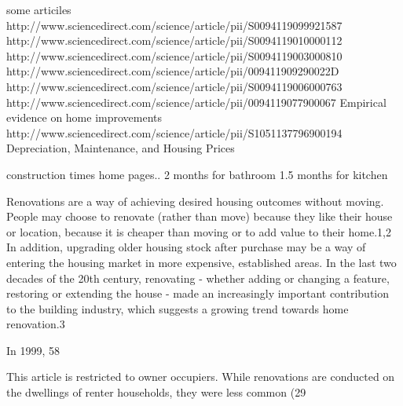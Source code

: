 

some articiles
http://www.sciencedirect.com/science/article/pii/S0094119099921587
http://www.sciencedirect.com/science/article/pii/S0094119010000112
http://www.sciencedirect.com/science/article/pii/S0094119003000810
http://www.sciencedirect.com/science/article/pii/009411909290022D
http://www.sciencedirect.com/science/article/pii/S0094119006000763
http://www.sciencedirect.com/science/article/pii/0094119077900067 Empirical evidence on home improvements
http://www.sciencedirect.com/science/article/pii/S1051137796900194 Depreciation, Maintenance, and Housing Prices



construction times home pages..
2 months for bathroom
1.5 months for kitchen




Renovations are a way of achieving desired housing outcomes without moving. People may choose to renovate (rather than move) because they like their house or location, because it is cheaper than moving or to add value to their home.1,2 In addition, upgrading older housing stock after purchase may be a way of entering the housing market in more expensive, established areas. In the last two decades of the 20th century, renovating - whether adding or changing a feature, restoring or extending the house - made an increasingly important contribution to the building industry, which suggests a growing trend towards home renovation.3

In 1999, 58%

This article is restricted to owner occupiers. While renovations are conducted on the dwellings of renter households, they were less common (29%


